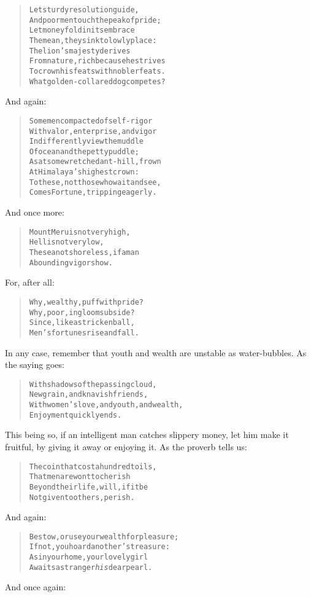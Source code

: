 \documentclass[article, twoside, 14pt]{memoir}
\renewenvironment{verbatim}{%
\begin{quote}%
\vskip -10pt%
\begin{alltt}\normalfont\large}{\end{alltt}%
\end{quote}%
\vskip -10pt
} %
\begin{document}
\begin{verbatim}
Let sturdy resolution guide,
And poor men touch the peak of pride;
Let money fold in its embrace
The mean, they sink to lowly place:
The lion's majesty derives
From nature, rich because he strives
To crown his feats with nobler feats.
What golden-collared dog competes?
\end{verbatim}
And again:

\begin{verbatim}
Some men compacted of self-rigor
With valor, enterprise, and vigor
Indifferently view the muddle
Of ocean and the petty puddle;
As at some wretched ant-hill, frown
At Himalaya's highest crown:
To these, not those who wait and see,
Comes Fortune, tripping eagerly.
\end{verbatim}
And once more:

\begin{verbatim}
Mount Meru is not very high,
    Hell is not very low,
The sea not shoreless, if a man
    Abounding vigor show.
\end{verbatim}
For, after all:

\begin{verbatim}
Why, wealthy, puff with pride?
Why, poor, in gloom subside?
Since, like a stricken ball,
Men's fortunes rise and fall.
\end{verbatim}
In any case, remember that youth and wealth are unstable as
water-bubbles. As the saying goes:

\begin{verbatim}
With shadows of the passing cloud,
    New grain, and knavish friends,
With women's love, and youth, and wealth,
    Enjoyment quickly ends.
\end{verbatim}
This being so, if an intelligent man catches slippery money, let
him make it fruitful, by giving it away or enjoying it. As the
proverb tells us:

\begin{verbatim}
The coin that cost a hundred toils,
    That men are wont to cherish
Beyond their life, will, if it be
    Not given to others, perish.
\end{verbatim}
And again:

\begin{verbatim}
Bestow, or use your wealth for pleasure;
If not, you hoard another's treasure:
As in your home, your lovely girl
Awaits a stranger{\textemdash}\emph{his} dear pearl.
\end{verbatim}
And once again:
\end{document}
